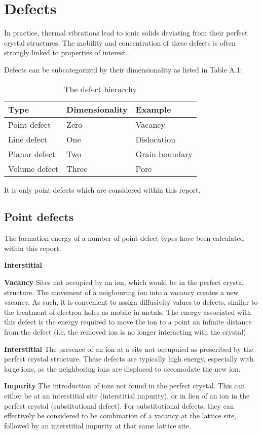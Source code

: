 \appendix
{}
\chapter{Defects}
In practice, thermal vibrations lead to ionic solids deviating from their perfect crystal structures. 
The mobility and concentration of these defects is often strongly linked to properties of interest.

Defects can be subcategorized by their dimensionality as listed in Table A.1:

\begin{table}[bh!]
\centering
\label{tab:defecthierarchy}
\caption{The defect hierarchy \citep{Carter2013}}
\begin{tabular}{@{}lll@{}}
\toprule
Type            & Dimensionality  & Example\\
\midrule
Point defect    & Zero            & Vacancy\\
Line defect     & One             & Dislocation\\
Planar defect   & Two             & Grain boundary\\
Volume defect   & Three           & Pore\\
\bottomrule
\end{tabular}
\end{table}

It is only point defects which are considered within this report.
\newpage
\section{Point defects}
The formation energy of a number of point defect types have been calculated within this report.


\begin{labeling}{\textbf{Interstitial}}
\item[\textbf{Vacancy}] Sites not occupied by an ion, which would be in the perfect crystal structure. The movement of a neigbouring ion into a vacancy creates a new vacancy. As such, it is convenient to assign diffusivity values to defects, similar to the treatment of electron holes as mobile in metals. The energy associated with this defect is the energy required to move the ion to a point an infinite distance from the defect (i.e. the removed ion is no longer interacting with the crystal).

\item[\textbf{Interstitial}] The presence of an ion at a site not occupuied as prescribed by the perfect crystal structure. These defects are typically high energy, especially with large ions, as the neighboring ions are displaced to accomodate the new ion.
\item[\textbf{Impurity}] The introduction of ions not found in the perfect crystal. This can either be at an interstitial site (interstitial impurity), or in lieu of an ion in the perfect crystal (substitutional defect).
For substitutional defects, they can effectively be considered to be combination of a vacancy at the lattice site, followed by an interstitial impurity at that same lattice site.
\end{labeling}

